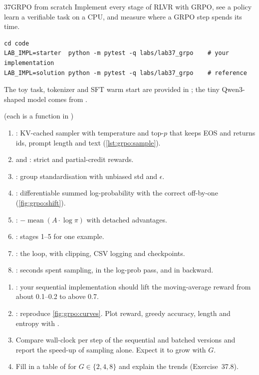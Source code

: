 \begin{labbox}{37}{GRPO from scratch}
Implement every stage of RLVR with GRPO, see a policy learn a verifiable task on a CPU, and
measure where a GRPO step spends its time.

\begin{lstlisting}[style=shell]
cd code
LAB_IMPL=starter  python -m pytest -q labs/lab37_grpo    # your implementation
LAB_IMPL=solution python -m pytest -q labs/lab37_grpo    # reference
\end{lstlisting}
The toy task, tokenizer and SFT warm start are provided in ; the tiny
Qwen3-shaped model comes from .

 (each is a function in )
\begin{enumerate}
\item {}: KV-cached sampler with temperature and top-$p$ that keeps EOS and returns
ids, prompt length and text (\cref{lst:grpo:sample}).
\item {} and : strict and partial-credit rewards.
\item {}: group standardisation with unbiased std and $\epsilon$.
\item {}: differentiable summed log-probability with the correct
off-by-one (\cref{fig:grpo:shift}).
\item {}: $-\operatorname{mean}(A\cdot\log\pi)$ with detached advantages.
\item {}: stages 1--5 for one example.
\item {}: the loop, with clipping, CSV logging and checkpoints.
\item {}: seconds spent sampling, in the log-prob pass, and in backward.
\end{enumerate}

\begin{enumerate}
\item {}: your
sequential implementation should lift the moving-average reward from about 0.1--0.2 to above 0.7.
\item {}: reproduce \cref{fig:grpo:curves}. Plot
reward, greedy accuracy, length and entropy with .
\item Compare wall-clock per step of the sequential and batched versions and report the
speed-up of sampling alone. Expect it to grow with $G$.
\item Fill in a table of  for $G\in\{2,4,8\}$ and explain the
trends (Exercise~37.8).
\end{enumerate}


\end{labbox}

